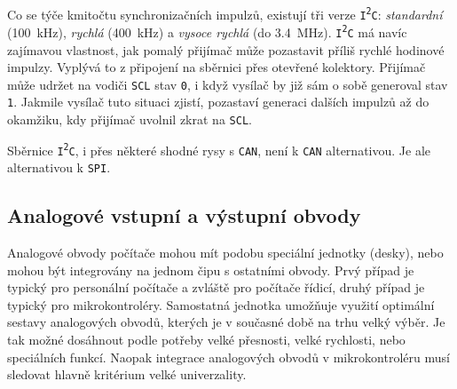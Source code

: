         Co se týče kmitočtu synchronizačních impulzů, existují tři verze 
        \texttt{I{\textsuperscript{2}}C}: \emph{standardní} (\SI{100}{\kilo\hertz}), \emph{rychlá} 
        (\SI{400}{\kilo\hertz}) a \emph{vysoce rychlá} (do \SI{3.4}{\mega\hertz}). 
        \texttt{I{\textsuperscript{2}}C} má navíc zajímavou vlastnost, jak pomalý přijímač může 
        pozastavit příliš rychlé hodinové impulzy. Vyplývá to z připojení na sběrnici přes otevřené 
        kolektory. Přijímač může udržet na vodiči \texttt{SCL} stav \texttt{0}, i když vysílač by 
        již sám o sobě generoval stav \texttt{1}. Jakmile vysílač tuto situaci zjistí, pozastaví 
        generaci dalších impulzů až do okamžiku, kdy přijímač uvolnil zkrat na \texttt{SCL}.
        
        Sběrnice \texttt{I{\textsuperscript{2}}C}, i přes některé shodné rysy s \texttt{CAN}, není 
        k \texttt{CAN} alternativou. Je ale alternativou k \texttt{SPI}. 
        
    \subsection{Analogové vstupní a výstupní obvody}
      Analogové obvody počítače mohou mít podobu speciální jednotky (desky), nebo mohou být 
      integrovány na jednom čipu s ostatními obvody. Prvý případ je typický pro personální počítače 
      a zvláště pro počítače řídicí, druhý případ je typický pro mikrokontroléry. Samostatná 
      jednotka umožňuje využití optimální sestavy analogových obvodů, kterých je v současné době na 
      trhu velký výběr. Je tak možné dosáhnout podle potřeby velké přesnosti, velké rychlosti, nebo 
      speciálních funkcí. Naopak integrace analogových obvodů v mikrokontroléru musí sledovat 
      hlavně kritérium velké univerzality.
      
